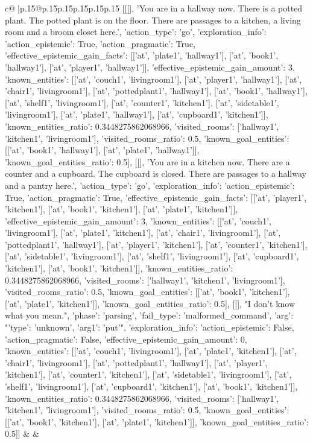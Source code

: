 \documentclass{article}
\begin{document}
{\begin{supertabular}{c@{$\;$}|p{.15\linewidth}@{}p{.15\linewidth}p{.15\linewidth}p{.15\linewidth}p{.15\linewidth}p{.15\linewidth}}
{{{	 [[[], 'You are in a hallway now. There is a potted plant. The potted plant is on the floor. There are passages to a kitchen, a living room and a broom closet here.', {'action_type': 'go', 'exploration_info': {'action_epistemic': True, 'action_pragmatic': True, 'effective_epistemic_gain_facts': [['at', 'plate1', 'hallway1'], ['at', 'book1', 'hallway1'], ['at', 'player1', 'hallway1']], 'effective_epistemic_gain_amount': 3, 'known_entities': [['at', 'couch1', 'livingroom1'], ['at', 'player1', 'hallway1'], ['at', 'chair1', 'livingroom1'], ['at', 'pottedplant1', 'hallway1'], ['at', 'book1', 'hallway1'], ['at', 'shelf1', 'livingroom1'], ['at', 'counter1', 'kitchen1'], ['at', 'sidetable1', 'livingroom1'], ['at', 'plate1', 'hallway1'], ['at', 'cupboard1', 'kitchen1']], 'known_entities_ratio': 0.3448275862068966, 'visited_rooms': ['hallway1', 'kitchen1', 'livingroom1'], 'visited_rooms_ratio': 0.5, 'known_goal_entities': [['at', 'book1', 'hallway1'], ['at', 'plate1', 'hallway1']], 'known_goal_entities_ratio': 0.5}}], [[], 'You are in a kitchen now. There are a counter and a cupboard. The cupboard is closed. There are passages to a hallway and a pantry here.', {'action_type': 'go', 'exploration_info': {'action_epistemic': True, 'action_pragmatic': True, 'effective_epistemic_gain_facts': [['at', 'player1', 'kitchen1'], ['at', 'book1', 'kitchen1'], ['at', 'plate1', 'kitchen1']], 'effective_epistemic_gain_amount': 3, 'known_entities': [['at', 'couch1', 'livingroom1'], ['at', 'plate1', 'kitchen1'], ['at', 'chair1', 'livingroom1'], ['at', 'pottedplant1', 'hallway1'], ['at', 'player1', 'kitchen1'], ['at', 'counter1', 'kitchen1'], ['at', 'sidetable1', 'livingroom1'], ['at', 'shelf1', 'livingroom1'], ['at', 'cupboard1', 'kitchen1'], ['at', 'book1', 'kitchen1']], 'known_entities_ratio': 0.3448275862068966, 'visited_rooms': ['hallway1', 'kitchen1', 'livingroom1'], 'visited_rooms_ratio': 0.5, 'known_goal_entities': [['at', 'book1', 'kitchen1'], ['at', 'plate1', 'kitchen1']], 'known_goal_entities_ratio': 0.5}}], [[], "I don't know what you mean.", {'phase': 'parsing', 'fail_type': 'malformed_command', 'arg': "{'type': 'unknown', 'arg1': 'put'}", 'exploration_info': {'action_epistemic': False, 'action_pragmatic': False, 'effective_epistemic_gain_amount': 0, 'known_entities': [['at', 'couch1', 'livingroom1'], ['at', 'plate1', 'kitchen1'], ['at', 'chair1', 'livingroom1'], ['at', 'pottedplant1', 'hallway1'], ['at', 'player1', 'kitchen1'], ['at', 'counter1', 'kitchen1'], ['at', 'sidetable1', 'livingroom1'], ['at', 'shelf1', 'livingroom1'], ['at', 'cupboard1', 'kitchen1'], ['at', 'book1', 'kitchen1']], 'known_entities_ratio': 0.3448275862068966, 'visited_rooms': ['hallway1', 'kitchen1', 'livingroom1'], 'visited_rooms_ratio': 0.5, 'known_goal_entities': [['at', 'book1', 'kitchen1'], ['at', 'plate1', 'kitchen1']], 'known_goal_entities_ratio': 0.5}}]] 
	  } 
	   } 
	   } 
	 & & \\ 
 


\end{supertabular}}
\end{document}
